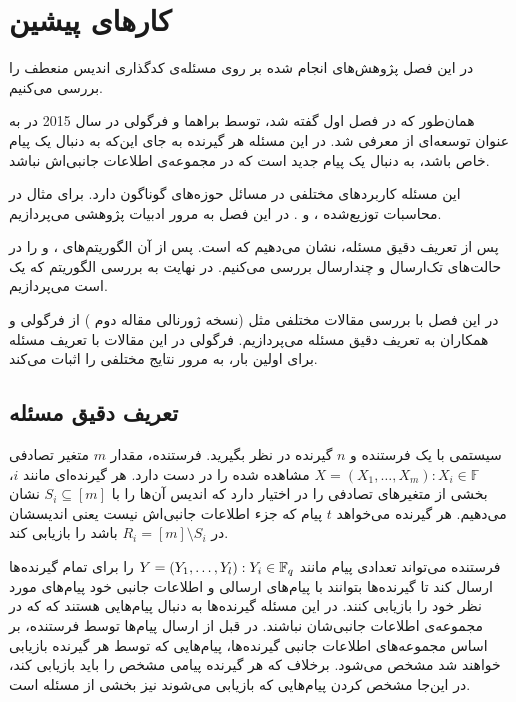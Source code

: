 \chapter{کارهای پیشین}
\label{chapter:literature}
در این فصل پژوهش‌های انجام شده بر روی مسئله‌ی کدگذاری اندیس منعطف را بررسی می‌کنیم.

همان‌طور که در فصل اول گفته شد، \picod توسط براهما و فرگولی در سال 2015 در
\cite{pliablefirstpaper}
به عنوان توسعه‌ای از \icod معرفی شد. در این مسئله هر گیرنده به جای این‌که به دنبال یک پیام خاص باشد، به دنبال یک پیام جدید است که در مجموعه‌ی اطلاعات جانبی‌‌اش نباشد.

این مسئله کاربردهای مختلفی در مسائل حوزه‌های گوناگون دارد. برای مثال در محاسبات توزیع‌شده
\cite{datashuf}،
\cite{8404065}
و
\cite{8682270}. در این فصل به مرور ادبیات پژوهشی
\picod
می‌پردازیم.

پس از تعریف دقیق مسئله، نشان می‌دهیم که
\picod
\nphard
است. پس از آن الگوریتم‌های
،
و
را در حالت‌های تک‌ارسال و چندارسال بررسی می‌کنیم. در نهایت به بررسی الگوریتم
که یک
است می‌پردازیم.

در این فصل با بررسی مقالات مختلفی مثل
\cite{pliablefirstpaper,6620405, pliable2015paper,  song2017polynomialtime}
(نسخه ژورنالی مقاله دوم
\cite{pliable2016})
از فرگولی و همکاران به تعریف دقیق مسئله می‌پردازیم. فرگولی در این مقالات با تعریف مسئله برای اولین بار، به مرور نتایج مختلفی را اثبات می‌کند.


\section{تعریف دقیق مسئله}
\label{sec:3:3}
سیستمی با یک فرستنده و
$n$
گیرنده در نظر بگیرید. فرستنده، مقدار
$m$
متغیر تصادفی
$X = (X_1, \ldots, X_m): X_i \in \mathbb{F}$
مشاهده شده را در دست دارد. هر گیرنده‌ای مانند
$i$، بخشی از متغیرهای تصادفی را در اختیار دارد که اندیس آن‌ها را با
$S_i \subseteq [m]$
نشان می‌دهیم. هر گیرنده می‌خواهد
$t$
پیام که جزء اطلاعات جانبی‌اش نیست یعنی اندیسشان در
$R_i = [m] \setminus S_i$
باشد را بازیابی کند.

فرستنده می‌تواند تعدادی پیام مانند
$Y = (Y_1, \ldots, Y_l): Y_i \in \mathbb{F}_q$
را برای تمام گیرنده‌ها ارسال کند تا گیرنده‌ها بتوانند با پیام‌های ارسالی و اطلاعات جانبی خود پیام‌های مورد نظر خود را بازیابی کنند. در این مسئله گیرنده‌ها به دنبال پیام‌هایی هستند که که در مجموعه‌ی اطلاعات جانبی‌شان نباشند. در
\picod
قبل از ارسال پیام‌ها توسط فرستنده، بر اساس مجموعه‌های اطلاعات جانبی گیرنده‌ها، پیام‌هایی که توسط هر گیرنده بازیابی خواهند شد مشخص می‌شود. برخلاف
\icod
که هر گیرنده پیامی مشخص را باید بازیابی کند، در این‌جا مشخص کردن پیام‌هایی که بازیابی می‌شوند نیز بخشی از مسئله است.

